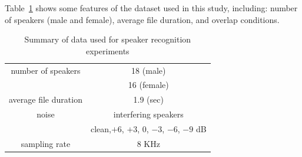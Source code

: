 Table~\ref{tab:ch2_data_summary} shows some features of the dataset used in this study, including: number of speakers (male and female), average file duration, and overlap conditions. 

\begin{table}[h!]
	\begin{center}
		\caption{ Summary of data used for speaker recognition experiments}
		\begin{tabular}{| c | c |}
			\hline
			\hline
			number of speakers	& 18 (male)  \\
			\hspace{4mm}			&  16 (female) \\
			\hline
			average file duration	&   1.9 (sec) \\ 
			\hline
			noise				& interfering speakers \\
			\hspace{4mm}			& clean,$+6$, $+3$, $0$, $-3$, $-6$, $-9$ dB \\
			\hline
			sampling rate			& $8$ KHz \\
			\hline
			\hline	
		\end{tabular}
		\label{tab:ch2_data_summary}
	\end{center}
\end{table}

